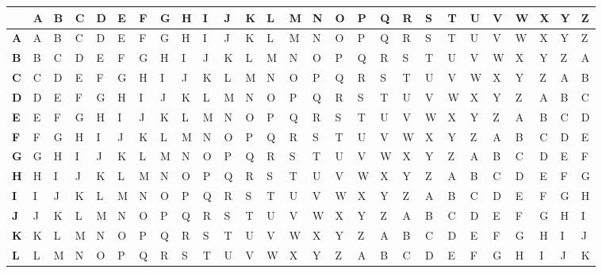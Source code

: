 \documentclass[a4paper]{article}
\begin{document}
\begin{center}
\begin{longtable}
{|p{1.5mm}|p{1.5mm}|p{1.5mm}|p{1.5mm}|p{1.5mm}|p{1.5mm}|p{1.5mm}|p{1.5mm}|p{1.5mm}|p{1.5mm}|p{1.5mm}|p{1.5mm}|p{1.5mm}|p{1.5mm}|p{1.5mm}|p{1.5mm}|p{1.5mm}|p{1.5mm}|p{1.5mm}|p{1.5mm}|p{1.5mm}|p{1.5mm}|p{1.5mm}|p{1.5mm}|p{1.5mm}|p{1.5mm}|p{1.5mm}|}
\hline
 & \textbf{A} & \textbf{B} & \textbf{C} & \textbf{D} & \textbf{E} & \textbf{F} & \textbf{G} & \textbf{H} & \textbf{I} & \textbf{J} & \textbf{K} & \textbf{L} & \textbf{M} & \textbf{N} & \textbf{O} & \textbf{P} & \textbf{Q} & \textbf{R} & \textbf{S} & \textbf{T} & \textbf{U} & \textbf{V} &
\textbf{W} & \textbf{X} & \textbf{Y} & \textbf{Z} \\
\hline
\textbf{A} & A & B & C & D & E & F & G & H & I & J & K & L & M & N & O & P & Q & R & S & T & U & V &
W & X & Y & Z
\\
\hline
\textbf{B} & B & C & D & E & F & G & H & I & J & K & L & M & N & O & P & Q & R & S & T & U & V & W & X
 & Y & Z & A
\\
\hline
\textbf{C} & C & D & E & F & G & H & I & J & K & L & M & N & O & P & Q & R & S & T & U & V & W & X & Y
 & Z & A & B
\\
\hline
\textbf{D} & D & E & F & G & H & I & J & K & L & M & N & O & P & Q & R & S & T & U & V & W & X & Y & Z
 & A & B & C
\\
\hline
\textbf{E} & E & F & G & H & I & J & K & L & M & N & O & P & Q & R & S & T & U & V & W & X & Y & Z & A
 & B & C & D
\\
\hline
\textbf{F} & F & G & H & I & J & K & L & M & N & O & P & Q & R & S & T & U & V & W & X & Y & Z & A & B
 & C & D & E
\\
\hline
\textbf{G} & G & H & I & J & K & L & M & N & O & P & Q & R & S & T & U & V & W & X & Y & Z & A & B & C
 & D & E & F
\\
\hline
\textbf{H} & H & I & J & K & L & M & N & O & P & Q & R & S & T & U & V & W & X & Y & Z & A & B & C & D
 & E & F & G
\\
\hline
\textbf{I} & I & J & K & L & M & N & O & P & Q & R & S & T & U & V & W & X & Y & Z & A & B & C & D & E
 & F & G & H
\\
\hline
\textbf{J} & J & K & L & M & N & O & P & Q & R & S & T & U & V & W & X & Y & Z & A & B & C & D & E & F & G & H & I
\\
\hline
\textbf{K} & K & L & M & N & O & P & Q & R & S & T & U & V & W & X & Y & Z & A & B & C & D & E & F & G & H & I & J
\\
\hline
\textbf{L} & L & M & N & O & P & Q & R & S & T & U & V & W & X & Y & Z & A & B & C & D & E & F & G & H & I & J & K

\end{longtable}
\end{center}
\end{document}
